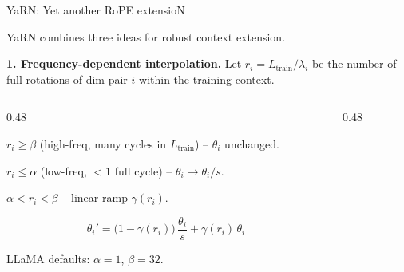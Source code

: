 \begin{frame}{YaRN: Yet another RoPE extensioN~\cite{peng2023yarn}}

  YaRN combines three ideas for robust context extension.

  \vspace{0.4em}
  \textbf{1. Frequency-dependent interpolation.}
  Let $r_i = L_{\text{train}}/\lambda_i$ be the number of full rotations of dim pair $i$ within the training context.

  \vspace{0.3em}
  \begin{columns}[T]
    \begin{column}{0.48\textwidth}
      \begin{description}[labelwidth=\widthof{\bfseries Interp.:~~}, leftmargin=!, font=\small]
        \item[Keep:] $r_i \ge \beta$ (high-freq, many cycles in $L_{\text{train}}$) -- $\theta_i$ unchanged.
        \item[Interp.:] $r_i \le \alpha$ (low-freq, $<\!1$ full cycle) -- $\theta_i \to \theta_i/s$.
        \item[Blend:] $\alpha < r_i < \beta$ -- linear ramp $\gamma(r_i)$.
      \end{description}

      \vspace{0.3em}
      \[
        \theta_i' = \bigl(1 - \gamma(r_i)\bigr)\,\frac{\theta_i}{s} + \gamma(r_i)\,\theta_i
      \]

      \vspace{0.2em}
      LLaMA defaults: $\alpha = 1$, $\beta = 32$.
    \end{column}
    \begin{column}{0.48\textwidth}
      \centering
\end{column}
\end{columns}
\end{frame}
